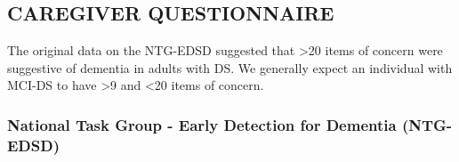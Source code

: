 \subsection{CAREGIVER QUESTIONNAIRE}

The original data on the NTG-EDSD suggested that >20 items of concern were suggestive of dementia in adults with DS. We generally expect an individual with MCI-DS to have >9 and <20 items of concern. 

\subsubsection{National Task Group - Early Detection for Dementia (NTG-EDSD)}

